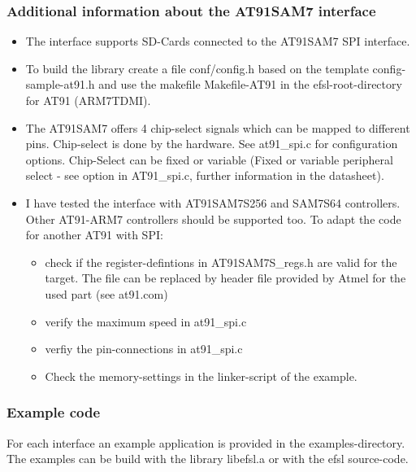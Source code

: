 \subsubsection{Additional information about the AT91SAM7 interface}
	\begin{itemize}
	
\item The interface supports SD-Cards connected 
to the AT91SAM7 SPI interface. 

\item To build the library create a file 
conf/config.h based on the template 
config-sample-at91.h and use the 
makefile Makefile-AT91 in the
efsl-root-directory for AT91 (ARM7TDMI).

\item The AT91SAM7 offers 4 chip-select
signals which can be mapped to
different pins. Chip-select is done
by the hardware. See at91_spi.c
for configuration options.
Chip-Select can be fixed or variable
(Fixed or variable peripheral select - see 
option in AT91\_spi.c, further information 
in the datasheet).

\item I have tested the interface with  AT91SAM7S256 
and SAM7S64 controllers. Other AT91-ARM7 controllers 
should be supported too.
To adapt the code for another AT91 with SPI:
		\begin{itemize}
\item check if the register-defintions in AT91SAM7S\_regs.h 
are valid for the target. The file can be replaced
by header file provided by Atmel for the used part 
(see at91.com)
\item verify the maximum speed in at91_spi.c
\item verfiy the pin-connections in at91_spi.c
\item Check the memory-settings in the linker-script of
the example.
		\end{itemize}
	\end{itemize}


\subsubsection{Example code}

For each interface an example application is provided in the 
examples-directory. The examples can be build with the library 
libefsl.a or with the efsl source-code.

